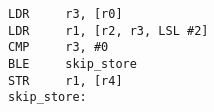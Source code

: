 \begin{lstlisting}[style=AsmStyle]
LDR     r3, [r0]            
LDR     r1, [r2, r3, LSL #2]
CMP     r3, #0              
BLE     skip_store 
STR     r1, [r4]            
skip_store:
\end{lstlisting}